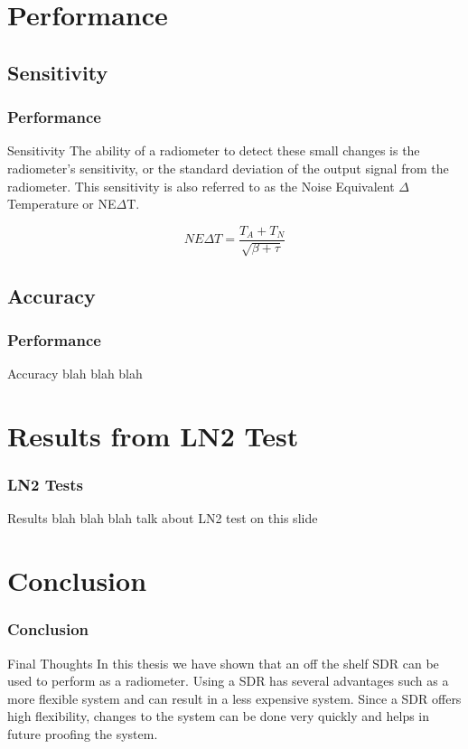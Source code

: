 \documentclass{beamer}
\begin{document}
\section{Performance}
\subsection{Sensitivity}
\begin{frame}
\frametitle{Performance}
\begin{block}{Sensitivity}
The ability of a radiometer to detect these small changes is the radiometer's sensitivity, or the standard deviation of the output signal from the radiometer.  This sensitivity is also referred to as the Noise Equivalent $\Delta$ Temperature or NE$\Delta$T. 

\begin{equation}
NE\Delta T=\frac{T_{A}+T_{N}}{\sqrt{\beta + \tau}}
\end{equation}
\end{block}
\end{frame}
\subsection{Accuracy}
\begin{frame}
\frametitle{Performance}
\begin{block}{Accuracy}
blah blah blah
\end{block}
\end{frame}


\section{Results from LN2 Test}
\begin{frame}
\frametitle{LN2 Tests}
\begin{block}{Results}
blah blah blah talk about LN2 test on this slide
\end{block}
\end{frame}
\section{Conclusion}
\begin{frame}
\frametitle{Conclusion}
\begin{block}{Final Thoughts}
In this thesis we have shown that an off the shelf SDR can be used to perform as a radiometer.  Using a SDR has several advantages such as a more flexible system and can result in a less expensive system.  Since a SDR offers high flexibility, changes to the system can be done very quickly and helps in future proofing the system.  
\end{block}
\end{frame}
\end{document}

